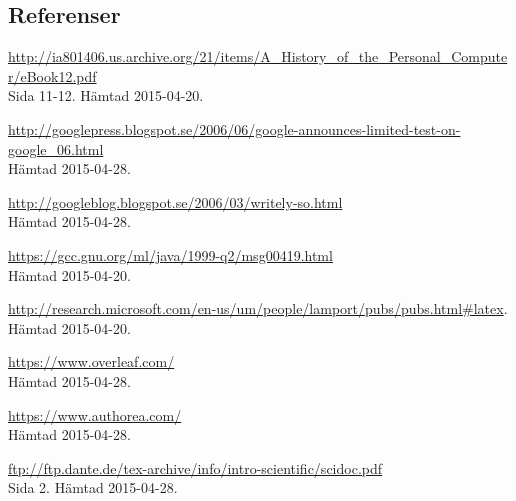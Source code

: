 \subsection{Referenser}
\vspace{-9mm}
\renewcommand{\refname}{}
\begin{thebibliography}{9}
\url{http://ia801406.us.archive.org/21/items/A_History_of_the_Personal_Computer/eBook12.pdf}\\
 Sida 11-12. Hämtad 2015-04-20.

\url{http://googlepress.blogspot.se/2006/06/google-announces-limited-test-on-google_06.html}\\
 Hämtad 2015-04-28.

\url{http://googleblog.blogspot.se/2006/03/writely-so.html}\\
 Hämtad 2015-04-28. 

\url{https://gcc.gnu.org/ml/java/1999-q2/msg00419.html}\\
 Hämtad 2015-04-20.

\url{http://research.microsoft.com/en-us/um/people/lamport/pubs/pubs.html#latex}.\\
 Hämtad 2015-04-20.
 
\url{https://www.overleaf.com/}\\
 Hämtad 2015-04-28.

\url{https://www.authorea.com/}\\
 Hämtad 2015-04-28.
 
\url{ftp://ftp.dante.de/tex-archive/info/intro-scientific/scidoc.pdf}\\
Sida 2. Hämtad 2015-04-28.

\end{thebibliography}
